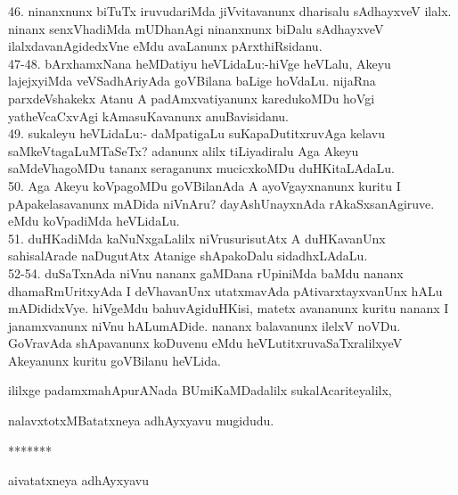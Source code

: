 \documentclass{article}
\begin{document}
46. ninanxnunx biTuTx iruvudariMda jiVvitavanunx dharisalu sAdhayxveV ilalx. ninanx senxVhadiMda mUDhanAgi ninanxnunx biDalu sAdhayxveV ilalxdavanAgidedxVne eMdu avaLanunx pArxthiRsidanu.\\
47-48. bArxhamxNana heMDatiyu heVLidaLu:-hiVge heVLalu, Akeyu lajejxyiMda veVSadhAriyAda goVBilana baLige hoVdaLu. nijaRna parxdeVshakekx Atanu A padAmxvatiyanunx karedukoMDu hoVgi yatheVcaCxvAgi kAmasuKavanunx anuBavisidanu.\\
49. sukaleyu heVLidaLu:- daMpatigaLu suKapaDutitxruvAga kelavu saMkeVtagaLuMTaSeTx? adanunx alilx tiLiyadiralu Aga Akeyu saMdeVhagoMDu tananx seraganunx mucicxkoMDu duHKitaLAdaLu.\\
50. Aga Akeyu koVpagoMDu goVBilanAda A ayoVgayxnanunx kuritu I pApakelasavanunx mADida niVnAru? dayAshUnayxnAda rAkaSxsanAgiruve. eMdu koVpadiMda heVLidaLu.\\
51. duHKadiMda kaNuNxgaLalilx niVrusurisutAtx A duHKavanUnx sahisalArade naDugutAtx Atanige shApakoDalu sidadhxLAdaLu.\\
52-54. duSaTxnAda niVnu nananx gaMDana rUpiniMda baMdu nananx dhamaRmUritxyAda I deVhavanUnx utatxmavAda pAtivarxtayxvanUnx hALu mADididxVye. hiVgeMdu bahuvAgiduHKisi, matetx avananunx kuritu nananx I janamxvanunx niVnu hALumADide. nananx balavanunx ilelxV noVDu. GoVravAda shApavanunx koDuvenu eMdu heVLutitxruvaSaTxralilxyeV Akeyanunx kuritu goVBilanu heVLida.\\

\begin{center}
ililxge padamxmahApurANada BUmiKaMDadalilx sukalAcariteyalilx,
\end{center}

\begin{center}
nalavxtotxMBatatxneya adhAyxyavu mugidudu.
\end{center}

\begin{center}
*******
\end{center}

\begin{center}
aivatatxneya adhAyxyavu
\end{center}
\end{document}
